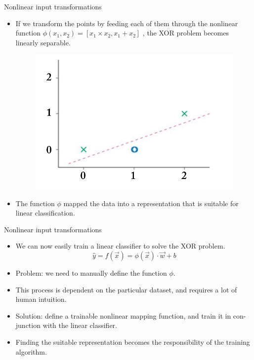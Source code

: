 \documentclass[handout]{beamer}
\begin{document}
\begin{frame}{Nonlinear input transformations}
\begin{scriptsize}
\begin{itemize}
\item If we transform the points by feeding each of them through the nonlinear function $\phi(x_1,x_2) = [x_1 \times x_2, x_1 + x_2 ]$ , the XOR problem becomes linearly separable.
\begin{figure}[htb]
	\centering
	 \includegraphics[scale=0.25]{pics/xor2.png}
\end{figure}

\item The function $\phi$ mapped the data into a representation that is suitable for linear classification.

\end{itemize}
\end{scriptsize}
\end{frame}


\begin{frame}{Nonlinear input transformations}
\begin{scriptsize}
\begin{itemize}
\item We can now easily train a linear classifier to solve the XOR problem.
\begin{equation}
 \hat{y} = f(\vec{x}) = \phi(\vec{x}) \cdot \vec{w} +b
\end{equation}
\item Problem: we need to manually define the function $\phi$.
\item This process is dependent on the particular dataset, and requires a lot of human intuition.
\item Solution: define a trainable nonlinear mapping function, and train it in con-
junction with the linear classifier.
\item Finding the suitable representation becomes the responsibility of the training algorithm.
\end{itemize}
\end{scriptsize}
\end{frame}
\end{document}

